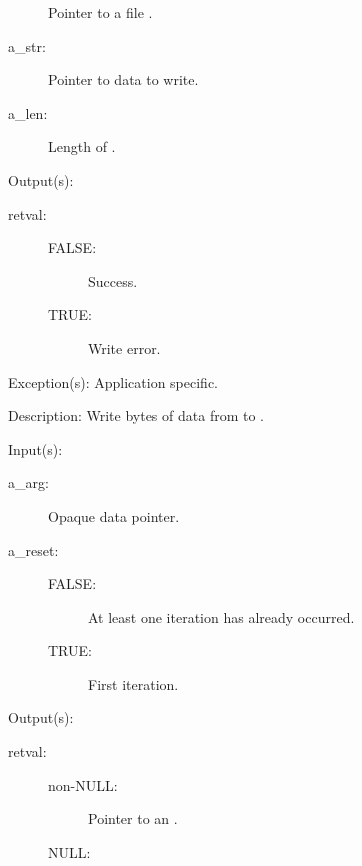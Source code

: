 \begin{capi}
\begin{capilist}
\begin{description}
			Pointer to a file .
		\item[a\_str: ]
			Pointer to data to write.
		\item[a\_len: ]
			Length of .
		\end{description}
	\item[Output(s): ]
		\begin{description}\item[]
		\item[retval: ]
			\begin{description}\item[]
			\item[FALSE: ]
				Success.
			\item[TRUE: ]
				Write error.
			\end{description}
		\end{description}
	\item[Exception(s): ] Application specific.
	\item[Description: ]
		Write  bytes of data from  to
		.
	\end{capilist}
\label{cw_nxo_file_ref_iter_t}
	\begin{capilist}
	\item[Input(s): ]
		\begin{description}\item[]
		\item[a\_arg: ]
			Opaque data pointer.
		\item[a\_reset: ]
			\begin{description}\item[]
			\item[FALSE: ]
				At least one iteration has already occurred.
			\item[TRUE: ]
				First iteration.
			\end{description}
		\end{description}
	\item[Output(s): ]
		\begin{description}\item[]
		\item[retval: ]
			\begin{description}\item[]
			\item[non-NULL: ]
				Pointer to an .
			\item[NULL: ]

\end{description}
\end{description}
\end{capilist}
\end{capi}
